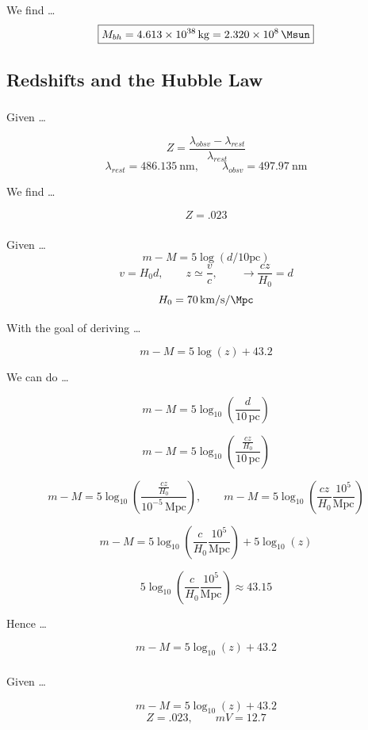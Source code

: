 \documentclass{article}
\begin{document}
We find \dots
\[\boxed{M_{bh} = \SI{4.613e+38 }{\kg} = \SI{2.320e+08}{\Msun}}\]

\subsection{Redshifts and the Hubble Law}
\subsubsection{}

Given \dots

\[Z = \frac{\lambda_{obsv} - \lambda_{rest}}{\lambda_{rest}}\]
\[\lambda_{rest} = \SI{486.135}{\nm}, \qquad \lambda_{obsv} = \SI{497.97}{\nm} \]

We find \dots

\[\boxed{Z = .023}\]

\subsubsection{}
Given \dots
\[m - M = 5 \log(d/10 \text{pc})\]
\[v = H_0 d, \qquad z \simeq \frac{v}{c}, \qquad  \rightarrow \frac{cz}{H_0} = d\]
\[H_0 = \SI{70}{\km /\s /\Mpc}\]

With the goal of deriving \dots

\[m - M = 5\log(z) + 43.2\]

We can do \dots

\[m - M = 5\log_{10}\!\left(\frac{d}{10\,\mathrm{pc}}\right)\]

\[m - M = 5\log_{10}\!\left(\frac{\frac{cz}{H_0}}{10\,\mathrm{pc}}\right)\]

\[m - M = 5\log_{10}\!\left(\frac{\frac{cz}{H_0}}{10^{-5}\,\mathrm{Mpc}}\right), \qquad m - M = 5\log_{10}\!\left(\frac{cz}{H_0}\frac{10^{5}}{\text{Mpc}}\right)\]

\[m - M = 5\log_{10}\!\left(\frac{c}{H_0}\frac{10^{5}}{\text{Mpc}}\right) + 5\log_{10}(z)\]


\[5\log_{10}\!\left(\frac{c}{H_0}\frac{10^{5}}{\text{Mpc}}\right) \approx 43.15\]

Hence \dots

\[\boxed{m - M = 5\log_{10}(z) + 43.2}\]


\subsubsection{}
Given \dots

\[m - M = 5\log_{10}(z) + 43.2\]
\[Z = .023, \qquad mV = 12.7\]
\end{document}
